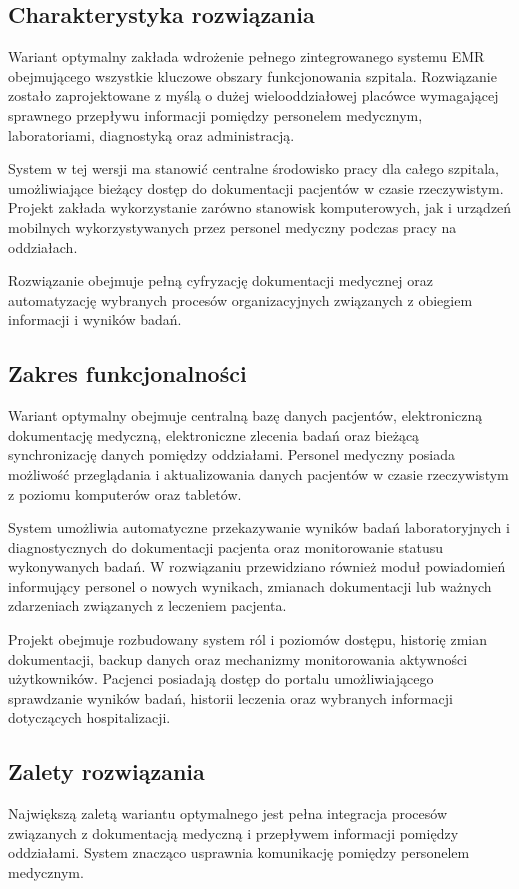 \subsection{Charakterystyka rozwiązania}
Wariant optymalny zakłada wdrożenie pełnego zintegrowanego systemu EMR obejmującego wszystkie kluczowe obszary funkcjonowania szpitala. Rozwiązanie zostało zaprojektowane z myślą o dużej wielooddziałowej placówce wymagającej sprawnego przepływu informacji pomiędzy personelem medycznym, laboratoriami, diagnostyką oraz administracją.

System w tej wersji ma stanowić centralne środowisko pracy dla całego szpitala, umożliwiające bieżący dostęp do dokumentacji pacjentów w czasie rzeczywistym. Projekt zakłada wykorzystanie zarówno stanowisk komputerowych, jak i urządzeń mobilnych wykorzystywanych przez personel medyczny podczas pracy na oddziałach.

Rozwiązanie obejmuje pełną cyfryzację dokumentacji medycznej oraz automatyzację wybranych procesów organizacyjnych związanych z obiegiem informacji i wyników badań.

\subsection{Zakres funkcjonalności}
Wariant optymalny obejmuje centralną bazę danych pacjentów, elektroniczną dokumentację medyczną, elektroniczne zlecenia badań oraz bieżącą synchronizację danych pomiędzy oddziałami. Personel medyczny posiada możliwość przeglądania i aktualizowania danych pacjentów w czasie rzeczywistym z poziomu komputerów oraz tabletów.

System umożliwia automatyczne przekazywanie wyników badań laboratoryjnych i diagnostycznych do dokumentacji pacjenta oraz monitorowanie statusu wykonywanych badań. W rozwiązaniu przewidziano również moduł powiadomień informujący personel o nowych wynikach, zmianach dokumentacji lub ważnych zdarzeniach związanych z leczeniem pacjenta.

Projekt obejmuje rozbudowany system ról i poziomów dostępu, historię zmian dokumentacji, backup danych oraz mechanizmy monitorowania aktywności użytkowników. Pacjenci posiadają dostęp do portalu umożliwiającego sprawdzanie wyników badań, historii leczenia oraz wybranych informacji dotyczących hospitalizacji.


\subsection{Zalety rozwiązania}
Największą zaletą wariantu optymalnego jest pełna integracja procesów związanych z dokumentacją medyczną i przepływem informacji pomiędzy oddziałami. System znacząco usprawnia komunikację pomiędzy personelem medycznym.

